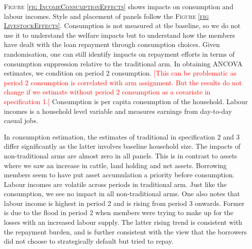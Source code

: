 	\textsc{\small Figure \ref{fig IncomeConsumptionEffects}} shows impacts on consumption and labour incomes. Style and placement of panels follow the \textsc{\footnotesize Figure \ref{fig LivestockEffects}}. Consumption is not measured at the baseline, so we do not use it to understand the welfare impacts but to understand how the members have dealt with the loan repayment through consumption choices. Given randomisation, one can still identify impacts on repayment efforts in terms of consumption suppression relative to the \textsf{traditional} arm. In obtaining ANCOVA estimates, we condition on period 2 consumption. \textcolor{red}{[This can be problematic as period 2 consumption is correlated with arm assignment. But the results do not change if we estimate without period 2 consumption as a covariate in specification 1.]} Consumption is per capita consumption of the household. Labour incomes is a household level variable and measures earnings from day-to-day casual jobs. 

	In consumption estimation, the estimates of \textsf{traditional} in specification 2 and 3 differ significantly as the latter involves baseline household size. The impacts of non-\textsf{traditional} arms are almost zero in all panels. This is in contrast to assets where we saw an increase in cattle, land holding and net assets. Borrowing members seem to have put asset accumulation a priority before consumption. Labour incomes are volatile across periods in \textsf{traditional} arm. Just like the consumption, we see no impact in all non-\textsf{traditional} arms. One also notes that labour income is highest in period 2 and is rising from period 3 onwards. Former is due to the flood in period 2 when members were trying to make up for the losses with an increased labour supply. The latter rising trend is consistent with the repayment burden, and is further consistent with the view that the borrowers did not choose to strategically default but tried to repay. 
	

